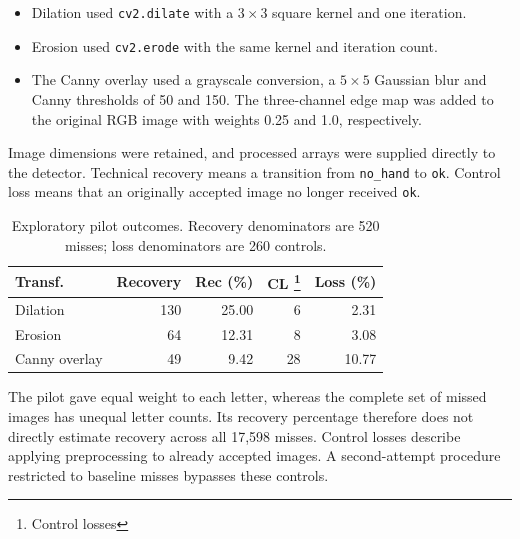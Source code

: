 \begin{itemize}
\item Dilation used \texttt{cv2.dilate} with a \(3\times3\) square kernel and one iteration.
\item Erosion used \texttt{cv2.erode} with the same kernel and iteration count.
\item The Canny overlay used a grayscale conversion, a \(5\times5\) Gaussian blur and Canny thresholds of 50 and 150. The three-channel edge map was added to the original RGB image with weights 0.25 and 1.0, respectively.
\end{itemize}

Image dimensions were retained, and processed arrays were supplied directly to the detector. Technical recovery means a transition from \texttt{no\_hand} to \texttt{ok}. Control loss means that an originally accepted image no longer received \texttt{ok}.

\begin{table}[ht]\centering
\caption{Exploratory pilot outcomes. Recovery denominators are 520 misses; loss denominators are 260 controls.}
\label{tab:rq2-pilot}
\begin{tabular}{lrrrr}\toprule
Transf. & Recovery & Rec (\%) & CL \footnote{Control losses} & Loss (\%)\\\midrule
Dilation & 130 & 25.00 & 6 & 2.31\\
Erosion & 64 & 12.31 & 8 & 3.08\\
Canny overlay & 49 & 9.42 & 28 & 10.77\\\bottomrule
\end{tabular}
\end{table}

The pilot gave equal weight to each letter, whereas the complete set of missed images has unequal letter counts. Its recovery percentage therefore does not directly estimate recovery across all 17,598 misses. Control losses describe applying preprocessing to already accepted images. A second-attempt procedure restricted to baseline misses bypasses these controls.

